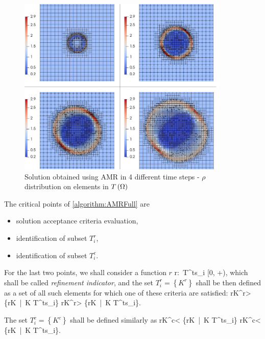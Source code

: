 \begin{figure}[H]
	\begin{center}
		\includegraphics[width=0.9\textwidth]{img/adapt/timedep/a.jpg}
		\caption{Solution obtained using AMR in 4 different time steps - $\rho$ distribution on elements in $T\left(\Omega\right)$}
	\label{figure:amrTimedep}
	\end{center}
\end{figure}
\vspace{-4mm}

The critical points of \cref{algorithm:AMRFull} are
\begin{itemize}
\item solution acceptance criteria evaluation,
\item identification of subset $T^{r}_i$,
\item identification of subset $T^{c}_i$.
\end{itemize}
For the last two points, we shall consider a function $r$
\be
\label{refinementIndicator}
r:\ T^{ts}_i \rightarrow [0, +\infty),
\ee
which shall be called \textit{refinement indicator}, and the set $T^{r}_i = \left\{K^{r}\right\}$ shall be then defined as a set of all such elements for which one of these criteria are satisfied:
\be
	\label{refIndicatorValues}
	r\lo K^{r}\ro > \alpha \cdot \max\left\{r\lo K\ro\ |\ K \in T^{ts}_i\right\} 
\ee
\be
	r\lo K^{r}\ro > \beta \cdot \sum\left\{r\lo K\ro\ |\ K \in T^{ts}_i\right\}.
\ee

The set $T^{c}_i = \left\{K^{c}\right\}$ shall be defined similarly as
\be
	r\lo K^{c}\ro < \gamma \cdot \max\left\{r\lo K\ro\ |\ K \in T^{ts}_i\right\} 
\ee
\be
	\label{refIndicatorValuesEnd}
	r\lo K^{c}\ro < \delta \cdot \sum\left\{r\lo K\ro\ |\ K \in T^{ts}_i\right\}.
\ee

